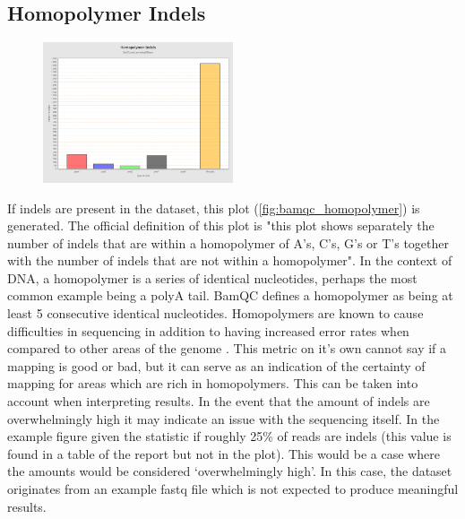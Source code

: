 \subsection{Homopolymer Indels \label{subsec:bamqc_homopolymer}}
\begin{figure}
  \begin{center}
    \includegraphics[width=0.5\textwidth]{figures/bamqc_homopolymer.png}
  \end{center}
  \label{fig:bamqc_homopolymer}
\end{figure}
If indels are present in the dataset, this plot (\autoref{fig:bamqc_homopolymer}) is generated. The official definition of this plot is "this plot shows separately the number of indels that are within a homopolymer of A’s, C’s, G’s or T’s together with the number of indels that are not within a homopolymer". In the context of DNA, a homopolymer is a series of identical nucleotides, perhaps the most common example being a polyA tail. BamQC defines a homopolymer as being at least 5 consecutive identical nucleotides. Homopolymers are known to cause difficulties in sequencing in addition to having increased error rates when compared to other areas of the genome \cite{kunkel2004dna,fazekas2010improving}. This metric on it's own cannot say if a mapping is good or bad, but it can serve as an indication of the certainty of mapping for areas which are rich in homopolymers. This can be taken into account when interpreting results. In the event that the amount of indels are overwhelmingly high it may indicate an issue with the sequencing itself. In the example figure given the statistic if roughly 25\% of reads are indels (this value is found in a table of the report but not in the plot). This would be a case where the amounts would be considered `overwhelmingly high'. In this case, the dataset originates from an example fastq file which is not expected to produce meaningful results.

